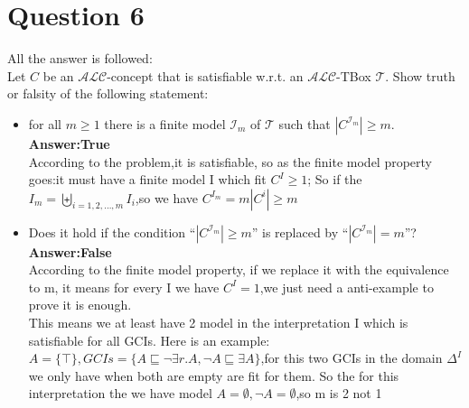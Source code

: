 \documentclass{article}
\begin{document}
    \section{Question 6}
    All the answer is followed:\\
    Let $C$ be an $\mathcal{ALC}$-concept that is satisfiable w.r.t. an $\mathcal{ALC}$-TBox $\mathcal{T}$. Show truth or falsity of the following statement: 
    \begin{itemize}
        \item for all $m\geq 1$ there is a finite model $\mathcal{I}_{m}$ of $\mathcal{T}$ such that $|C^{\mathcal{I}_{m}}|\geq m$.\\
        \textbf{Answer:True}\\
        According to the problem,it is satisfiable, so as the finite model property goes:it must have a finite model I which fit $C^I \geq 1$;
        So if the $I_m = \biguplus_{i = 1,2,...,m} I_i$,so we have $C^{I_m} = m|C^i| \geq m$
        
        \item Does it hold if the condition ``$|C^{\mathcal{I}_{m}}|\geq m$'' is replaced by ``$|C^{\mathcal{I}_{m}}|=m$''?
        \textbf{Answer:False}\\
        According to the finite model property, if we replace it with the equivalence to m, it means for every I we have $C^I = 1$,we just need a anti-example to prove it is enough.\\
        This means we at least have 2 model in the interpretation I which is satisfiable for all GCIs.
        Here is an example:$A=\{\top\},GCIs=\{A \sqsubseteq \lnot \exists r.A,\lnot A \sqsubseteq \exists A\}$,for this two GCIs in the domain $\Delta^I$ we only have when both are empty are fit for them.
        So the for this interpretation the we have model $A = \emptyset,\lnot A = \emptyset $,so m is 2 not 1\\
    \end{itemize}
\end{document}
